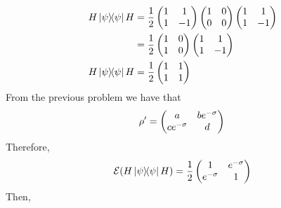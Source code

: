 \begin{align}
    H\ketbra{\psi}H &= \frac{1}{2}\begin{pmatrix}1 & 1 \\ 1 & -1\end{pmatrix} \begin{pmatrix}1 & 0 \\ 0 & 0\end{pmatrix} \begin{pmatrix}1 & 1 \\ 1 & -1\end{pmatrix} \\
    &= \frac{1}{2}\begin{pmatrix}1 & 0 \\ 1 & 0\end{pmatrix} \begin{pmatrix}1 & 1 \\ 1 & -1\end{pmatrix} \\
    H\ketbra{\psi}H &= \frac{1}{2} \begin{pmatrix}1 & 1 \\ 1 & 1\end{pmatrix}
\end{align}
From the previous problem we have that 
\begin{equation}
    \rho' = \begin{pmatrix} a & b e^{-\sigma} \\ ce^{-\sigma} & d \end{pmatrix} \\
\end{equation}
Therefore, 
\begin{equation}
    \mathcal{E}(H\ketbra{\psi}H) = \frac{1}{2}\begin{pmatrix} 1 & e^{-\sigma} \\ e^{-\sigma} & 1 \end{pmatrix}
\end{equation}
Then,
